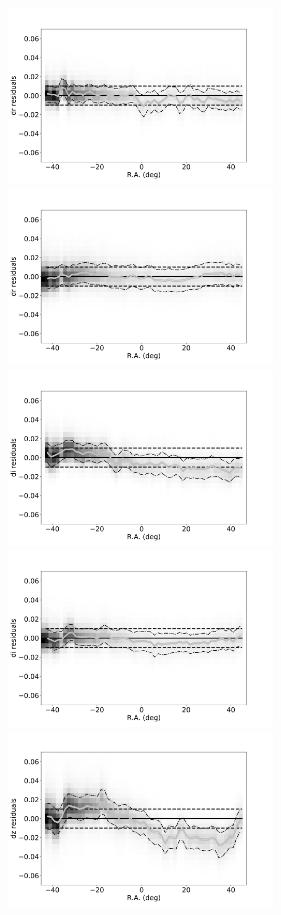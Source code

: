 \begin{figure}[th!]
    \centering\includegraphics[width=7cm]{figures/colorResidDES2bright_dr_RA_Hess.png}
    \centering\includegraphics[width=7cm]{figures/colorResidPSbright_dr_RA_Hess.png}
    \centering\includegraphics[width=7cm]{figures/colorResidDES2bright_di_RA_Hess.png}
    \centering\includegraphics[width=7cm]{figures/colorResidPSbright_di_RA_Hess.png}
    \centering\includegraphics[width=7cm]{figures/colorResidDES2bright_dz_RA_Hess.png}

\end{figure}
